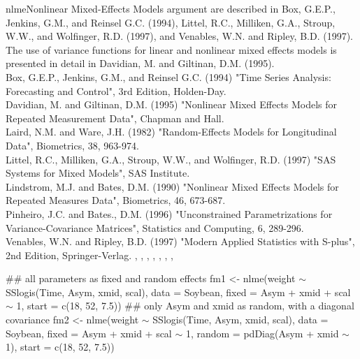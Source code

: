 \documentclass[pdftex]{article} \usepackage{url,graphicx}
\renewcommand{\Twiddle}{\mbox{\(\sim\)}}
\begin{document}
\begin{Helpfile}{nlme}{Nonlinear Mixed-Effects Models}
 argument are described in Box, G.E.P., Jenkins,
G.M., and Reinsel G.C. (1994), Littel, R.C., Milliken, G.A., Stroup,
W.W., and Wolfinger, R.D. (1997), and Venables, W.N. and Ripley,
B.D. (1997). The use of variance functions for linear and nonlinear
mixed effects models is presented in detail in Davidian, M. and
Giltinan, D.M. (1995).  \\
Box, G.E.P., Jenkins, G.M., and Reinsel G.C. (1994) "Time Series
Analysis: Forecasting and Control", 3rd Edition, Holden-Day. \\
Davidian, M. and Giltinan, D.M. (1995) "Nonlinear Mixed Effects Models
for Repeated Measurement Data", Chapman and Hall.\\
Laird, N.M. and Ware, J.H. (1982) "Random-Effects Models for
Longitudinal Data", Biometrics, 38, 963-974.  \\
Littel, R.C., Milliken, G.A., Stroup, W.W., and Wolfinger, R.D. (1997)
"SAS Systems for Mixed Models", SAS Institute.\\
Lindstrom, M.J. and Bates, D.M. (1990) "Nonlinear Mixed Effects Models
for Repeated Measures Data", Biometrics, 46, 673-687.\\
Pinheiro, J.C. and Bates., D.M.  (1996) "Unconstrained
Parametrizations for Variance-Covariance Matrices", Statistics and
Computing, 6, 289-296.\\
Venables, W.N. and Ripley, B.D. (1997) "Modern Applied Statistics with
S-plus", 2nd Edition, Springer-Verlag.
, ,
, ,
, , , 
\need 15pt
\vspace{-16pt}
\begin{Example}
## all parameters as fixed and random effects
fm1 <- nlme(weight {\Twiddle} SSlogis(Time, Asym, xmid, scal), 
            data = Soybean, fixed = Asym + xmid + scal {\Twiddle} 1, 
            start = c(18, 52, 7.5))
## only Asym and xmid as random, with a diagonal covariance 
fm2 <- nlme(weight {\Twiddle} SSlogis(Time, Asym, xmid, scal), 
            data = Soybean, fixed = Asym + xmid + scal {\Twiddle} 1, 
            random = pdDiag(Asym + xmid {\Twiddle} 1),
            start = c(18, 52, 7.5))
\end{Example}
\end{Helpfile}
\end{document}

